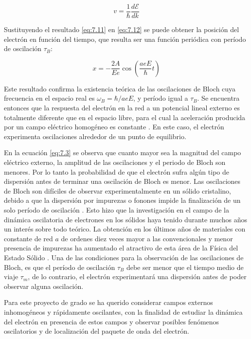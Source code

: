\begin{equation}\label{eq:7.12}
v=\frac{1}{\hbar}\frac{d\mathcal{E}}{dk}
\end{equation}

Sustituyendo el resultado \ref{eq:7.11} en \ref{eq:7.12} se puede obtener la posición del electrón en función del tiempo, que resulta ser una función periódica con período de oscilación $\tau_B$:

\begin{equation}\label{eq:7.13}
    x=-\frac{2A}{Ee}\cos(\frac{aeE}{\hbar}t)
\end{equation}

 Este resultado confirma la existencia teórica de las oscilaciones de Bloch cuya frecuencia en el espacio real es $\omega_B=\hbar/aeE$, y período igual a $\tau_B$. Se encuentra entonces que la respuesta del electrón en la red a un potencial lineal externo es totalmente diferente que en el espacio libre, para el cual la aceleración producida por un campo eléctrico homogéneo es constante \cite{kittel}. En este caso, el electrón experimenta oscilaciones alrededor de un punto de equilibrio.
 
En la ecuación \ref{eq:7.3} se observa que cuanto mayor sea la magnitud del campo eléctrico externo, la amplitud de las oscilaciones y el periodo de Bloch son menores. Por lo tanto la probabilidad de que el electrón sufra algún tipo de dispersión antes de terminar una oscilación de Bloch es menor. Las oscilaciones de Bloch son difíciles de observar experimentalmente en un sólido cristalino, debido a que la dispersión por impurezas o fonones impide la finalización de un solo período de oscilación \cite{raizen}. Esto hizo que la investigación en el campo de la dinámica oscilatoria de electrones en los sólidos haya tenido durante muchos años un interés sobre todo teórico. La obtención en los últimos años de materiales con constante de red $a$ de ordenes diez veces mayor a las convencionales y menor presencia de impurezas ha aumentado el atractivo de esta área de la Física del Estado Sólido \cite{wannier2}. Una de las condiciones para la observación de las oscilaciones de Bloch, es que el período de oscilación $\tau_B$ debe ser menor que el tiempo medio de viaje $\tau_m$, de lo contrario, el electrón experimentará una dispersión antes de poder observar alguna oscilación.


Para este proyecto de grado se ha querido considerar campos externos inhomogéneos y rápidamente oscilantes, con la finalidad de estudiar la dinámica del electrón en presencia de estos campos y observar posibles fenómenos oscilatorios y de localización del paquete de onda del electrón.
